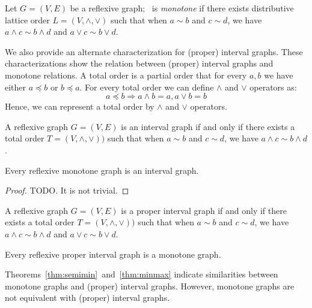 \begin{defi} 
Let \(G=(V,E)\) be a reflexive graph; \mG\ is \emph{monotone} if there exists distributive lattice order
\(L=(V, \wedge, \vee)\) such that
when \(a\sim b\) and \(c \sim d\), we have \(a \wedge c \sim b \wedge d\) and \(a \vee c \sim b \vee d\)\@.
\end{defi}

We also provide an alternate characterization for (proper) interval graphs.
These characterizations show the relation between (proper) interval graphs and monotone relations. 
A total order is a partial order that for every \(a, b\) we have either \(a \preceq b\)
or \(b \preceq a\)\@. For every total order we can define \(\wedge\) and \(\vee\) operators as:
\[a \preceq b \Rightarrow a \wedge b = a, a \vee b = b\]
Hence, we can represent a total order by \(\wedge\) and \(\vee\) operators.

\begin{theorem}[TODO] \label{thm:semimin}
A reflexive graph \(G=(V,E)\) is an interval graph if and only if there exists
a total order \(T=(V,\wedge,\vee))\) such that
when \(a\sim b\) and \(c \sim d\), we have \(a \wedge c \sim b \wedge d\)\@.
\end{theorem}

\begin{lemma} \label{lem:intmon}
Every reflexive monotone graph is an interval graph.
\end{lemma}

\begin{proof}
TODO. It is not trivial.
\end{proof}

\begin{theorem} [TODO] \label{thm:minmax}
A reflexive graph \(G=(V,E)\) is a proper interval graph if and only if there exists
a total order \(T=(V,\wedge,\vee))\) such that
when \(a\sim b\) and \(c \sim d\), we have \(a \wedge c \sim b \wedge d\) and \(a \vee c \sim b \vee d\)\@.
\end{theorem}

\begin{cor} \label{cor:pintmon}
Every reflexive proper interval graph is a monotone graph.
\end{cor}

Theorems~\ref{thm:semimin}~and~\ref{thm:minmax} indicate similarities between
monotone graphs and (proper) interval graphs. However, monotone graphs are not
equivalent with (proper) interval graphs.

